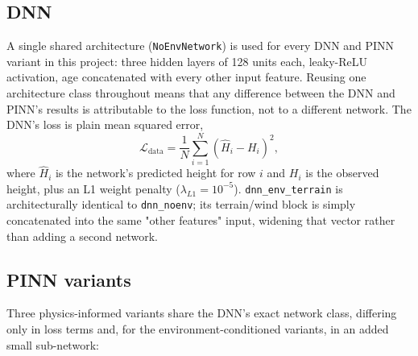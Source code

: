 \subsection{DNN}

A single shared architecture (\texttt{NoEnvNetwork}) is used for every DNN and PINN variant in
this project: three hidden layers of 128 units each, leaky-ReLU activation, age concatenated with
every other input feature. Reusing one architecture class throughout means that any difference
between the DNN and PINN's results is attributable to the loss function, not to a different
network. The DNN's loss is plain mean squared error,
\begin{equation}
\mathcal{L}_{\text{data}} = \frac{1}{N}\sum_{i=1}^{N}\left(\hat H_i - H_i\right)^2,
\label{eq:data-loss}
\end{equation}
where $\hat H_i$ is the network's predicted height for row $i$ and $H_i$ is the observed height,
plus an L1 weight penalty ($\lambda_{L1}=10^{-5}$). \texttt{dnn\_env\_terrain} is architecturally
identical to \texttt{dnn\_noenv}; its terrain/wind block is simply concatenated into the same
"other features" input, widening that vector rather than adding a second network.

\subsection{PINN variants}

Three physics-informed variants share the DNN's exact network class, differing only in loss
terms and, for the environment-conditioned variants, in an added small sub-network:

